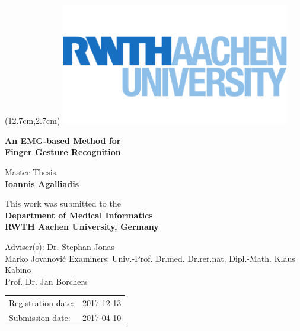 
\titlehead{
} %


\begin{titlepage}

\begin{textblock*}{10cm} (12.7cm,2.7cm)
\includegraphics[width=10cm,keepaspectratio]{logos/rwth}
\end{textblock*}

\let\footnotesize\small \let\footnoterule\relax

\hbox{}
\vfill

\centering

\begin{doublespace} 
{ \huge\sffamily\textbf{An EMG-based Method for}}\\ \vspace{0.7em}
 {\huge\sffamily\textbf{Finger Gesture Recognition}} \\ \vspace{0.2em}

\end{doublespace}
\vskip 2cm

{\large\sffamily

Master Thesis\\[5pt]
\textbf{Ioannis Agalliadis}
\vskip 1cm

This work was submitted to the\\[5pt]
\textbf{Department of Medical Informatics\\[5pt]
        RWTH Aachen University, Germany}
\vskip 2cm

Adviser(s):
\vskip 2mm
Dr. Stephan Jonas\\
Marko Jovanovi{\' c}
\vskip 5mm
Examiners:
\vskip 2mm
Univ.-Prof. Dr.med. Dr.rer.nat. Dipl.-Math. Klaus Kabino\\
Prof. Dr. Jan Borchers
\vskip 1cm

\begin{tabular}{R{6cm}p{6cm}}
Registration date:  & 2017-12-13 \\
Submission date:    & 2017-04-10 \\
\end{tabular}

} %

\vfill

\end{titlepage}

\cleardoublepage
